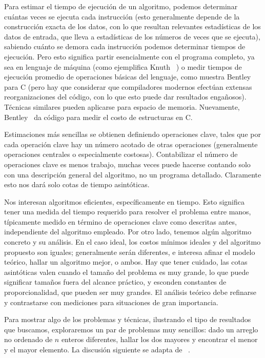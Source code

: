   Para estimar el tiempo de ejecución de un algoritmo,
  podemos determinar cuántas veces se ejecuta cada instrucción
  (esto generalmente depende de la construcción exacta de los datos,
   con lo que resultan relevantes estadísticas de los datos de entrada,
   que lleva a estadísticas de los números de veces que se ejecuta),
  sabiendo cuánto se demora cada instrucción
  podemos determinar tiempos de ejecución.
  Pero esto significa partir esencialmente con el programa completo,
  ya sea en lenguaje de máquina
  (como ejemplifica Knuth~%
     \cite{knuth97:_fundam_algor, knuth97:_semin_algor,knuth98:_sortin_searc})
  o medir tiempos de ejecución promedio de operaciones básicas del lenguaje,
  como muestra Bentley~%
    \cite{bentley99:_programming_pearls}
  para C
  (pero hay que considerar que compiladores modernos
   efectúan extensas reorganizaciones del código,
   con lo que esto puede dar resultados engañosos).
  Técnicas similares pueden aplicarse para espacio de memoria.
  Nuevamente,
  Bentley~%
    \cite{bentley99:_programming_pearls}
  da código para medir el costo de estructuras en C.

  Estimaciones más sencillas se obtienen definiendo operaciones clave,
  tales que por cada operación clave hay un número acotado de otras operaciones
  (generalmente operaciones centrales o especialmente costosas).
  Contabilizar el número de operaciones clave es menos trabajo,
  muchas veces puede hacerse
  contando solo con una descripción general del algoritmo,
  no un programa detallado.
  Claramente esto nos dará solo cotas de tiempo asintóticas.

  Nos interesan algoritmos eficientes,
  específicamente en tiempo.
  Esto significa tener una medida del tiempo requerido
  para resolver el problema entre manos,
  típicamente medido en término de operaciones clave como descritas antes,
  independiente del algoritmo empleado.
  Por otro lado,
  tenemos algún algoritmo concreto y su análisis.
  En el caso ideal,
  los costos mínimos ideales y del algoritmo propuesto son iguales;
  generalmente serán diferentes,
  e interesa afinar el modelo teórico,
  hallar un algoritmo mejor,
  o ambos.
  Hay que tener cuidado,
  las cotas asintóticas valen cuando el tamaño del problema es muy grande,
  lo que puede significar tamaños fuera del alcance práctico,
  y esconden constantes de proporcionalidad,
  que pueden ser muy grandes.
  El análisis teórico debe refinarse y contrastarse con mediciones
  para situaciones de gran importancia.

  Para mostrar algo de los problemas y técnicas,
  ilustrando el tipo de resultados que buscamos,
  exploraremos un par de problemas muy sencillos:
  dado un arreglo no ordenado de \(n\) enteros diferentes,
  hallar los dos mayores
  y encontrar el menor y el mayor elemento.
  La discusión siguiente se adapta de~%
    \cite{OpenDSA16:_senior_algorithms}.

